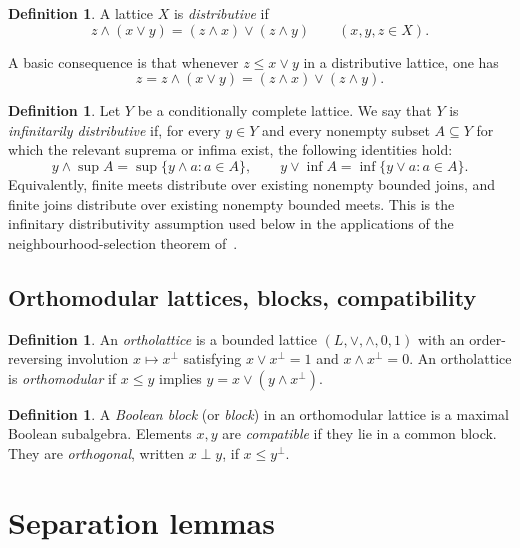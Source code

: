 \documentclass[11pt]{amsart}
\theoremstyle{definition}
\newtheorem{definition}[theorem]{Definition}
\newcommand{\join}{\vee}
\newcommand{\meet}{\wedge}
\begin{document}
\begin{definition}
A lattice $X$ is \emph{distributive} if
\[
z\meet(x\join y)=(z\meet x)\join(z\meet y)\qquad(x,y,z\in X).
\]
\end{definition}

A basic consequence is that whenever $z\le x\join y$ in a distributive lattice, one has
\begin{equation}\label{eq:decomp}
z=z\meet(x\join y)=(z\meet x)\join(z\meet y).
\end{equation}

\begin{definition}\label{def:inf-distrib}
Let $Y$ be a conditionally complete lattice.
We say that $Y$ is \emph{infinitarily distributive} if, for every $y\in Y$ and every nonempty subset $A\subseteq Y$ for which the relevant suprema or infima exist, the following identities hold:
\[
y\meet\sup A=\sup\{y\meet a:a\in A\},
\qquad
 y\join\inf A=\inf\{y\join a:a\in A\}.
\]
Equivalently, finite meets distribute over existing nonempty bounded joins, and finite joins distribute over existing nonempty bounded meets.
This is the infinitary distributivity assumption used below in the applications of the neighbourhood-selection theorem of~\cite{BKP}.
\end{definition}

\subsection{Orthomodular lattices, blocks, compatibility}

\begin{definition}
An \emph{ortholattice} is a bounded lattice $(L,\join,\meet,0,1)$ with an order-reversing involution $x\mapsto x^\perp$
satisfying $x\join x^\perp=1$ and $x\meet x^\perp=0$.
An ortholattice is \emph{orthomodular} if $x\le y$ implies $y=x\join(y\meet x^\perp)$.
\end{definition}

\begin{definition}
A \emph{Boolean block} (or \emph{block}) in an orthomodular lattice is a maximal Boolean subalgebra.
Elements $x,y$ are \emph{compatible} if they lie in a common block.
They are \emph{orthogonal}, written $x\perp y$, if $x\le y^\perp$.
\end{definition}

\section{Separation lemmas}
\end{document}
